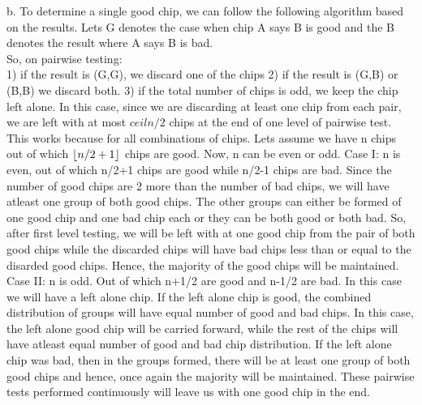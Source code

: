 \documentclass[10pt]{article}
\DeclarePairedDelimiter\floor{\lfloor}{\rfloor}
\begin{document}
b. To determine a single good chip, we can follow the following algorithm based on the results. Lets G denotes the case when chip A says B is good and the B denotes the result where A says B is bad.\\
So, on pairwise testing:\\
1) if the result is (G,G), we discard one of the chips
2) if the result is (G,B) or (B,B) we discard both.
3) if the total number of chips is odd, we keep the chip left alone.
In this case, since we are discarding at least one chip from each pair, we are left with at most $ceil{n/2}$ chips at the end of one level of pairwise test.\\
This works because for all combinations of chips. Lets assume we have n chips out of which $\floor*{n/2+1}$ chips are good. Now, n can be even or odd.
Case I: n is even, out of which n/2+1 chips are good while n/2-1 chips are bad. Since the number of good chips are 2 more than the number of bad chips, we will have atleast one group of both good chips. The other groups can either be formed of one good chip and one bad chip each or they can be both good or both bad. So, after first level testing, we will be left with at one good chip from the pair of both good chips while the discarded chips will have bad chips less than or equal to the disarded good chips. Hence, the majority of the good chips will be maintained.\\
Case II: n is odd. Out of which n+1/2 are good and n-1/2 are bad. In this case we will have a left alone chip. If the left alone chip is good, the combined distribution of groups will have equal number of good and bad chips. In this case, the left alone good chip will be carried forward, while the rest of the chips will have atleast equal number of good and bad chip distribution. If the left alone chip was bad, then in the groups formed, there will be at least one group of both good chips and hence, once again the majority will be maintained.
These pairwise tests performed continuously will leave us with one good chip in the end.
\end{document}
